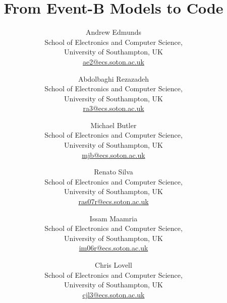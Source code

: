 \documentclass{easychair}
\begin{document}
%
\title{From Event-B Models to Code}

%


%

\author{Andrew Edmunds\\
School of Electronics and Computer Science,\\
University of Southampton, UK\\
\url{ae2@ecs.soton.ac.uk}\\
\and
Abdolbaghi Rezazadeh\\
School of Electronics and Computer Science,\\
University of Southampton, UK\\
\url{ra3@ecs.soton.ac.uk}\\
\and
Michael Butler\\
School of Electronics and Computer Science,\\
University of Southampton, UK\\
\url{mjb@ecs.soton.ac.uk}\\
\and
Renato Silva\\
School of Electronics and Computer Science,\\
University of Southampton, UK\\
\url{ras07r@ecs.soton.ac.uk}\\
\and
Issam Maamria\\
School of Electronics and Computer Science,\\
University of Southampton, UK\\
\url{im06r@ecs.soton.ac.uk}\\
\and
Chris Lovell\\
School of Electronics and Computer Science,\\
University of Southampton, UK\\
\url{cjl3@ecs.soton.ac.uk}
}
\end{document}
